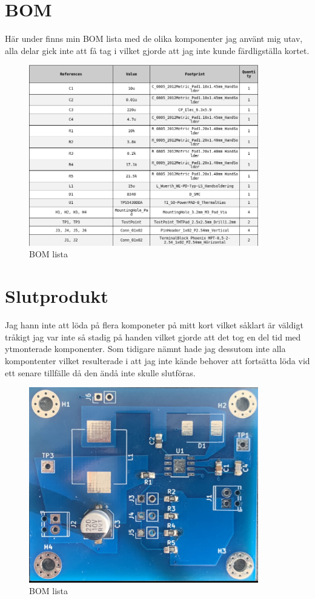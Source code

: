\documentclass{article}
\begin{document}
\section{BOM}

Här under finns min BOM lista med de olika komponenter jag använt mig utav, alla delar gick
inte att få tag i vilket gjorde att jag inte kunde färdligställa kortet.

\begin{figure}[htp]
\centering
\includegraphics[width=10cm]{img/bom.png}
\caption{BOM lista}
\end{figure}

\section{Slutprodukt}
Jag hann inte att löda på flera komponeter på mitt kort vilket såklart är väldigt tråkigt
jag var inte så stadig på handen vilket gjorde att det tog en del tid med ytmonterade 
komponenter. Som tidigare nämnt hade jag dessutom inte alla kompontenter vilket resulterade
i att jag inte kände behover att fortsätta löda vid ett senare tillfälle då den ändå 
inte skulle slutföras.

\begin{figure}[htp]
\centering
\includegraphics[width=10cm]{img/irlkort.jpeg}
\caption{BOM lista}
\end{figure}
\end{document}
